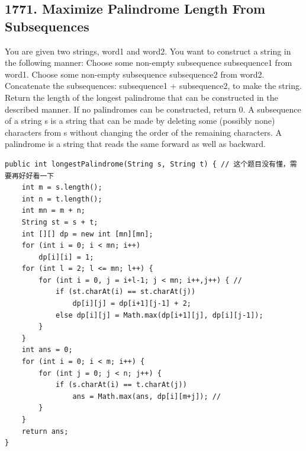 \documentclass[9pt, b5paper]{article}
\begin{document}
\subsection{1771. Maximize Palindrome Length From Subsequences}
\label{sec-4-37}
You are given two strings, word1 and word2. You want to construct a string in the following manner:
Choose some non-empty subsequence subsequence1 from word1.
Choose some non-empty subsequence subsequence2 from word2.
Concatenate the subsequences: subsequence1 + subsequence2, to make the string.
Return the length of the longest palindrome that can be constructed in the described manner. If no palindromes can be constructed, return 0.
A subsequence of a string s is a string that can be made by deleting some (possibly none) characters from s without changing the order of the remaining characters.
A palindrome is a string that reads the same forward as well as backward.
\begin{verbatim}
public int longestPalindrome(String s, String t) { // 这个题目没有懂，需要再好好看一下
    int m = s.length();
    int n = t.length();
    int mn = m + n;
    String st = s + t;
    int [][] dp = new int [mn][mn];
    for (int i = 0; i < mn; i++)
        dp[i][i] = 1;
    for (int l = 2; l <= mn; l++) {
        for (int i = 0, j = i+l-1; j < mn; i++,j++) { // 
            if (st.charAt(i) == st.charAt(j))
                dp[i][j] = dp[i+1][j-1] + 2;
            else dp[i][j] = Math.max(dp[i+1][j], dp[i][j-1]);                         
        }
    }
    int ans = 0;
    for (int i = 0; i < m; i++) {
        for (int j = 0; j < n; j++) {
            if (s.charAt(i) == t.charAt(j))
                ans = Math.max(ans, dp[i][m+j]); // 
        }
    }
    return ans;
}
\end{verbatim}
\end{document}
